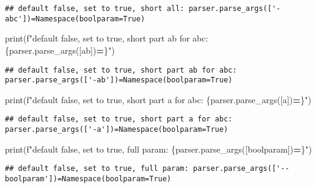 \documentclass[
]{book}
\newenvironment{Shaded}{\begin{snugshade}}{\end{snugshade}}
\newcommand{\BuiltInTok}[1]{#1}
\newcommand{\NormalTok}[1]{#1}
\newcommand{\OperatorTok}[1]{\textcolor[rgb]{0.81,0.36,0.00}{\textbf{#1}}}
\newcommand{\SpecialCharTok}[1]{\textcolor[rgb]{0.00,0.00,0.00}{#1}}
\newcommand{\SpecialStringTok}[1]{\textcolor[rgb]{0.31,0.60,0.02}{#1}}
\newcommand{\StringTok}[1]{\textcolor[rgb]{0.31,0.60,0.02}{#1}}
\begin{document}
\begin{verbatim}
## default false, set to true, short all: parser.parse_args(['-abc'])=Namespace(boolparam=True)
\end{verbatim}

\begin{Shaded}
\begin{Highlighting}[]
\BuiltInTok{print}\NormalTok{(}\SpecialStringTok{f"default false, set to true, short part ab for abc: }\SpecialCharTok{\{}\NormalTok{parser}\SpecialCharTok{.}\NormalTok{parse\_args([}\StringTok{\textquotesingle{}{-}ab\textquotesingle{}}\NormalTok{])}\OperatorTok{=}\SpecialCharTok{\}}\SpecialStringTok{"}\NormalTok{)}
\end{Highlighting}
\end{Shaded}

\begin{verbatim}
## default false, set to true, short part ab for abc: parser.parse_args(['-ab'])=Namespace(boolparam=True)
\end{verbatim}

\begin{Shaded}
\begin{Highlighting}[]
\BuiltInTok{print}\NormalTok{(}\SpecialStringTok{f"default false, set to true, short part a for abc: }\SpecialCharTok{\{}\NormalTok{parser}\SpecialCharTok{.}\NormalTok{parse\_args([}\StringTok{\textquotesingle{}{-}a\textquotesingle{}}\NormalTok{])}\OperatorTok{=}\SpecialCharTok{\}}\SpecialStringTok{"}\NormalTok{)}
\end{Highlighting}
\end{Shaded}

\begin{verbatim}
## default false, set to true, short part a for abc: parser.parse_args(['-a'])=Namespace(boolparam=True)
\end{verbatim}

\begin{Shaded}
\begin{Highlighting}[]
\BuiltInTok{print}\NormalTok{(}\SpecialStringTok{f"default false, set to true, full param: }\SpecialCharTok{\{}\NormalTok{parser}\SpecialCharTok{.}\NormalTok{parse\_args([}\StringTok{\textquotesingle{}{-}{-}boolparam\textquotesingle{}}\NormalTok{])}\OperatorTok{=}\SpecialCharTok{\}}\SpecialStringTok{"}\NormalTok{)}
\end{Highlighting}
\end{Shaded}

\begin{verbatim}
## default false, set to true, full param: parser.parse_args(['--boolparam'])=Namespace(boolparam=True)
\end{verbatim}
\end{document}
